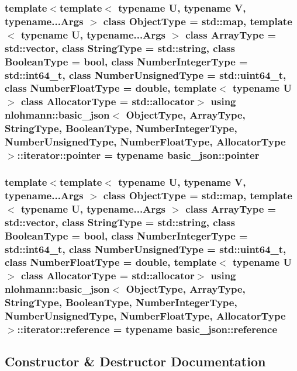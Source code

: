 \subsubsection[{\texorpdfstring{pointer}{pointer}}]{\setlength{\rightskip}{0pt plus 5cm}template$<$template$<$ typename U, typename V, typename...\+Args $>$ class Object\+Type = std\+::map, template$<$ typename U, typename...\+Args $>$ class Array\+Type = std\+::vector, class String\+Type  = std\+::string, class Boolean\+Type  = bool, class Number\+Integer\+Type  = std\+::int64\+\_\+t, class Number\+Unsigned\+Type  = std\+::uint64\+\_\+t, class Number\+Float\+Type  = double, template$<$ typename U $>$ class Allocator\+Type = std\+::allocator$>$ using {\bf nlohmann\+::basic\+\_\+json}$<$ Object\+Type, Array\+Type, String\+Type, Boolean\+Type, Number\+Integer\+Type, Number\+Unsigned\+Type, Number\+Float\+Type, Allocator\+Type $>$\+::{\bf iterator\+::pointer} =  typename {\bf basic\+\_\+json\+::pointer}}\hypertarget{classnlohmann_1_1basic__json_1_1iterator_a3aae1df93a78b201d98e178c1c7d02a7}{}\label{classnlohmann_1_1basic__json_1_1iterator_a3aae1df93a78b201d98e178c1c7d02a7}
\subsubsection[{\texorpdfstring{reference}{reference}}]{\setlength{\rightskip}{0pt plus 5cm}template$<$template$<$ typename U, typename V, typename...\+Args $>$ class Object\+Type = std\+::map, template$<$ typename U, typename...\+Args $>$ class Array\+Type = std\+::vector, class String\+Type  = std\+::string, class Boolean\+Type  = bool, class Number\+Integer\+Type  = std\+::int64\+\_\+t, class Number\+Unsigned\+Type  = std\+::uint64\+\_\+t, class Number\+Float\+Type  = double, template$<$ typename U $>$ class Allocator\+Type = std\+::allocator$>$ using {\bf nlohmann\+::basic\+\_\+json}$<$ Object\+Type, Array\+Type, String\+Type, Boolean\+Type, Number\+Integer\+Type, Number\+Unsigned\+Type, Number\+Float\+Type, Allocator\+Type $>$\+::{\bf iterator\+::reference} =  typename {\bf basic\+\_\+json\+::reference}}\hypertarget{classnlohmann_1_1basic__json_1_1iterator_a97aff5d71246774267a81066460dd1cf}{}\label{classnlohmann_1_1basic__json_1_1iterator_a97aff5d71246774267a81066460dd1cf}


\subsection{Constructor \& Destructor Documentation}
